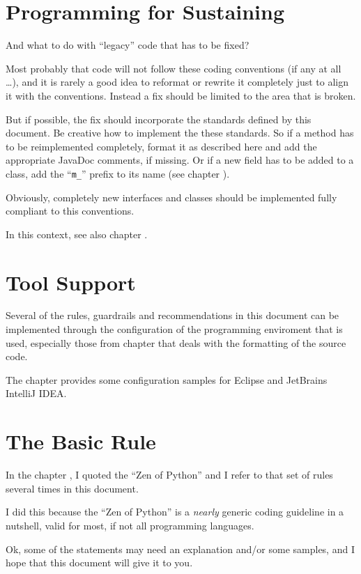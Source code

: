 \section{Programming for Sustaining}
And what to do with “legacy” code that has to be fixed?

Most probably that code will not follow these coding conventions (if any at all …), and it is rarely a good idea to reformat or rewrite it completely just to align it with the conventions. Instead a fix should be limited to the area that is broken.

But if possible, the fix should incorporate the standards defined by this document. Be creative how to implement the these standards. So if a method has to be reimplemented completely, format it as described here and add the appropriate JavaDoc comments, if missing. Or if a new field has to be added to a class, add the “\verb#m_#” prefix to its name (see chapter ).

Obviously, completely new interfaces and classes should be implemented fully compliant to this conventions.

In this context, see also chapter .

\section{Tool Support}
Several of the rules, guardrails and recommendations in this document can be implemented through the configuration of the programming enviroment that is used, especially those from chapter  that deals with the formatting of the source code.

The chapter  provides some configuration samples for Eclipse and JetBrains IntelliJ IDEA.

\section{The Basic Rule}\label{sec:TheBasicRule}
In the chapter , I quoted the “Zen of Python” and I refer to that set of rules several times in this document.

I did this because the “Zen of Python” is a \textit{nearly} generic coding guideline in a nutshell, valid for most, if not all programming languages.

Ok, some of the statements may need an explanation and/or some samples, and I hope that this document will give it to you.

